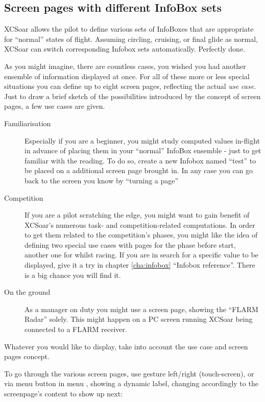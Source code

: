 \subsection*{Screen pages with different InfoBox sets}\label{sec:screenpages}

XCSoar allows the pilot to define various sets of InfoBoxes that are 
appropriate for ``normal'' states of flight.  Assuming circling,
cruising, or final glide as normal, XCSoar can switch corresponding Infobox 
sets automatically. Perfectly done.

As you might imagine, there are countless cases, you wished you had another 
ensemble of information displayed at once.  For all of these more or less 
special situations you can define up to eight screen pages, reflecting the 
actual \emph{use case}. Just to draw a brief sketch of the possibilities 
introduced by the concept of screen pages, a few use cases are given. 
\label{par:use_case}
\begin{description}
\item[Familiarisation] Especially if you are a beginner, you might study 
computed values in-flight in advance of placing them in your ``normal'' InfoBox
ensemble - just to get familiar with the reading. To do so, create a new 
Infobox named ``test'' to be placed on a additional screen page brought in. In
any case you can go back to the screen you know by ``turning a page''
\item[Competition] If you are a pilot scratching the edge, you might want to 
gain benefit of XCSoar's numerous task- and competition-related computations. 
In order to get them related to the competition's phases, you might like the 
idea of defining two special use cases with pages for the phase before start, 
another one for whilst racing.  If you are in search for a specific value to 
be displayed, give it a try in chapter \ref{cha:infobox} ``Infobox reference''.
There is a big chance you will find it.
\item[On the ground] As a manager on duty you might use a screen page, showing 
the ``FLARM Radar'' solely.  This might happen on a PC screen running XCSoar
being connected to a FLARM receiver.
\end{description}

Whatever you would like to display, take into account the use case and screen 
pages concept.

To go through the various screen pages, use gesture left/right (touch-screen), or via menu button in menu , showing a dynamic label, changing accordingly to the screenpage's content to show up next:

